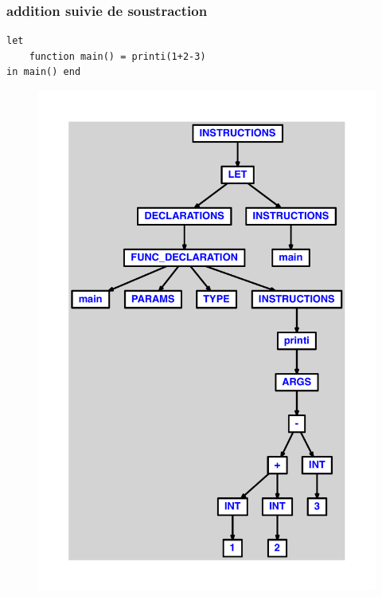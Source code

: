 \documentclass{article}
\begin{document}
\subsubsection{addition suivie de soustraction}
\begin{lstlisting}
let
	function main() = printi(1+2-3)
in main() end
\end{lstlisting}
\newpage
\begin{figure}[H]
\centering
\includegraphics[max width=\textwidth]{ast/ast_44.pdf}
\end{figure}
\newpage
\end{document}
